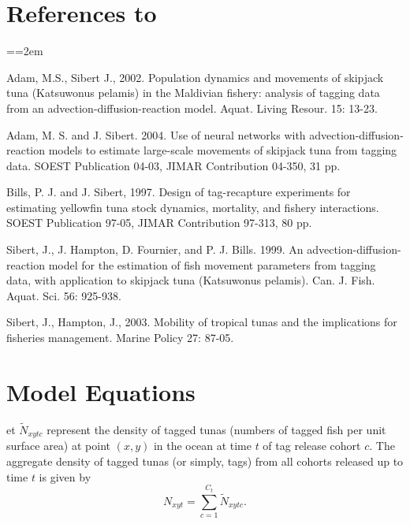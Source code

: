 \clearpage
\section*{References to \TT}
{\parindent=0cm \small
\everypar={\hangindent=2em }\par

Adam, M.S., Sibert J., 2002. Population dynamics and movements of
skipjack tuna (Katsuwonus pelamis) in the Maldivian fishery: analysis
of tagging data from an advection-diffusion-reaction model. Aquat.
Living Resour. 15: 13-23.

Adam, M. S. and J. Sibert. 2004. Use of neural networks with
advection-diffusion-reaction models to estimate large-scale movements
of skipjack tuna from tagging data. SOEST Publication 04-03, JIMAR
Contribution 04-350, 31 pp.

Bills, P. J. and J. Sibert, 1997. Design of tag-recapture experiments for estimating yellowfin tuna stock dynamics, mortality, and fishery interactions. SOEST Publication 97-05, JIMAR Contribution 97-313, 80 pp.

Sibert, J., J. Hampton, D. Fournier, and P. J. Bills. 1999. An
advection-diffusion-reaction model for the estimation of fish movement
parameters from tagging data, with application to skipjack tuna
(Katsuwonus pelamis). Can. J. Fish. Aquat. Sci. 56: 925-938. 

Sibert, J., Hampton, J., 2003. Mobility of tropical tunas and the
implications for fisheries management. Marine Policy 27: 87-05.
\par}

\section*{Model Equations}
et $\widetilde N_{xytc}$ represent the density of tagged tunas (numbers of
tagged fish per unit surface area) at point $(x,y)$ in the ocean at time $t$
 of tag release cohort $c$.
The aggregate density of tagged tunas (or simply, tags)
from all cohorts released up to
time $t$ is given by
\begin{equation}
 N_{xyt} = \sum_{c=1}^{C_t} \widetilde N_{xytc}.
\end{equation}

